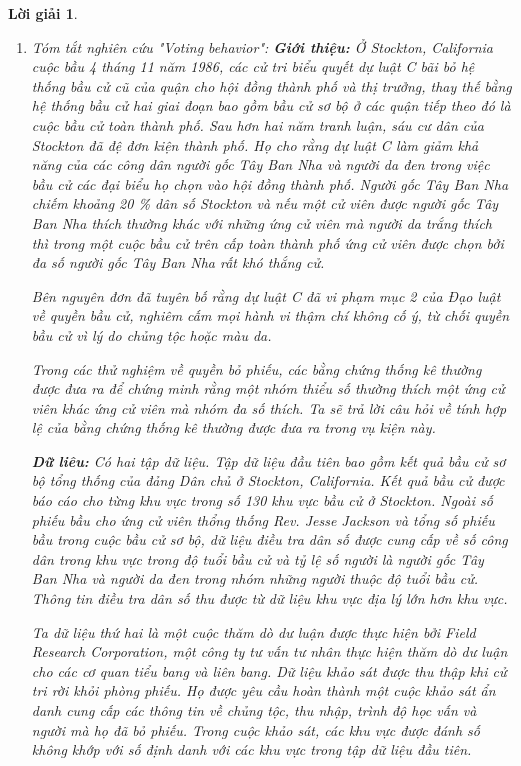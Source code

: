 \documentclass[14pt, a4paper]{article}
\theoremstyle{sltheorem}
\theoremstyle{soltheorem}
\newtheorem*{loigiai}{Lời giải}
\begin{document}
\begin{loigiai}
    \begin{enumerate}
        \item Tóm tắt nghiên cứu "Voting behavior":
        \textbf{Giới thiệu:}
        Ở Stockton, California cuộc bầu 4 tháng 11 năm 1986, các cử tri biểu quyết dự luật C bãi bỏ hệ thống bầu cử cũ của quận cho hội đồng thành phố và thị trưởng, thay thế bằng hệ thống bầu cử hai giai đoạn bao gồm bầu cử sơ bộ ở các quận tiếp theo đó là cuộc bầu cử toàn thành phố.
        Sau hơn hai năm tranh luận, sáu cư dân của Stockton đã đệ đơn kiện thành phố.
        Họ cho rằng dự luật C làm giảm khả năng của các công dân người gốc Tây Ban Nha và người da đen trong việc bầu cử các đại biểu họ chọn vào hội đồng thành phố.
        Người gốc Tây Ban Nha chiếm khoảng 20 \% dân số Stockton và nếu một cử viên được người gốc Tây Ban Nha thích thường khác với những ứng cử viên mà người da trắng thích thì trong một cuộc bầu cử trên cấp toàn thành phố ứng cử viên được chọn bởi đa số người gốc Tây Ban Nha rất khó thắng cử.

        Bên nguyên đơn đã tuyên bố rằng dự luật C đã vi phạm mục 2 của Đạo luật về quyền bầu cử, nghiêm cấm mọi hành vi thậm chí không cố ý, từ chối quyền bầu cử vì lý do chủng tộc hoặc màu da.

        Trong các thử nghiệm về quyền bỏ phiếu, các bằng chứng thống kê thường được đưa ra để chứng minh rằng một nhóm thiểu số thường thích một ứng cử viên khác ứng cử viên mà nhóm đa số thích.
        Ta sẽ trả lời câu hỏi về tính hợp lệ của bằng chứng thống kê thường được đưa ra trong vụ kiện này.

        \textbf{Dữ liêu:}
        Có hai tập dữ liệu.
        Tập dữ liệu đầu tiên bao gồm kết quả bầu cử sơ bộ tổng thống của đảng Dân chủ ở Stockton, California.
        Kết quả bầu cử được báo cáo cho từng khu vực trong số 130 khu vực bầu cử ở Stockton.
        Ngoài số phiếu bầu cho ứng cử viên thổng thống Rev. Jesse Jackson và tổng số phiếu bầu trong cuộc bầu cử sơ bộ, dữ liệu điều tra dân số được cung cấp về số công dân trong khu vực trong độ tuổi bầu cử và tỷ lệ số người là người gốc Tây Ban Nha và người da đen trong nhóm những người thuộc độ tuổi bầu cử.
        Thông tin điều tra dân số thu được từ dữ liệu khu vực địa lý lớn hơn khu vực.

        Ta dữ liệu thứ hai là một cuộc thăm dò dư luận được thực hiện bởi Field Research Corporation, một công ty tư vấn tư nhân thực hiện thăm dò dư luận cho các cơ quan tiểu bang và liên bang.
        Dữ liệu khảo sát được thu thập khi cử tri rời khỏi phòng phiếu.
        Họ được yêu cầu hoàn thành một cuộc khảo sát ẩn danh cung cấp các thông tin về chủng tộc, thu nhập, trình độ học vấn và người mà họ đã bỏ phiếu.
        Trong cuộc khảo sát, các khu vực được đánh số không khớp với số định danh với các khu vực trong tập dữ liệu đầu tiên.


\end{enumerate}
\end{loigiai}
\end{document}
